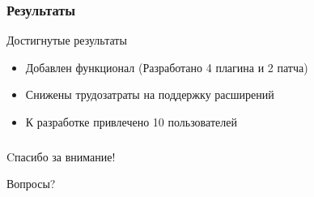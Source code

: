 \documentclass[unicode]{beamer}
\begin{document}
\begin{frame}
\transwipe[direction=90]
\frametitle{Результаты}
\begin{block}{Достигнутые результаты}
\begin{itemize}
  \item Добавлен функционал (Разработано 4 плагина и 2 патча)
  \item Снижены трудозатраты на поддержку расширений
  \item К разработке привлечено 10 пользователей
\end{itemize}
\end{block}
\end{frame}

\begin{frame}
\transwipe[direction=90]
\frametitle{}
\centerline{\large{Cпасибо за внимание!}}
\hspace{2cm}
\centerline{\huge{Вопросы?}}
\end{frame}
\end{document}
